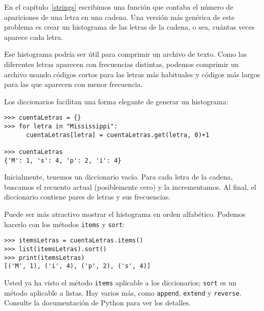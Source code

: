 En el capítulo~\ref{strings} escribimos una función que contaba
el número de apariciones de una letra en una cadena. Una versión más
genérica de este problema es crear un histograma de las letras de
la cadena, o sea, cuántas veces aparece cada letra.

Ese histograma podría ser útil para comprimir un archivo de texto.
Como las diferentes letras aparecen con frecuencias distintas, podemos
comprimir un archivo usando códigos cortos para las letras más habituales
y códigos más largos para las que aparecen con menor frecuencia.

Los diccionarios facilitan una forma elegante de generar un histograma:
\begin{lstlisting}
>>> cuentaLetras = {}
>>> for letra in "Mississippi":
      cuentaLetras[letra] = cuentaLetras.get(letra, 0)+1

>>> cuentaLetras
{'M': 1, 's': 4, 'p': 2, 'i': 4}
\end{lstlisting}

Inicialmente, tenemos un diccionario vacío. Para cada letra de la
cadena, buscamos el recuento actual (posiblemente cero) y la incrementamos.
Al final, el diccionario contiene pares de letras y sus frecuencias.

Puede ser más atractivo mostrar el histograma en orden alfabético.
Podemos hacerlo con los métodos \texttt{items} y \texttt{sort}:
\begin{lstlisting}
>>> itemsLetras = cuentaLetras.items()
>>> list(itemsLetras).sort()
>>> print(itemsLetras)
[('M', 1), ('i', 4), ('p', 2), ('s', 4)]
\end{lstlisting}

Usted ya ha visto el método \texttt{items} aplicable a los diccionarios;
\texttt{sort} es un método aplicable a listas. Hay varios más, como
\texttt{append}, \texttt{extend} y \texttt{reverse}. Consulte la documentación
de Python para ver los detalles.

 

